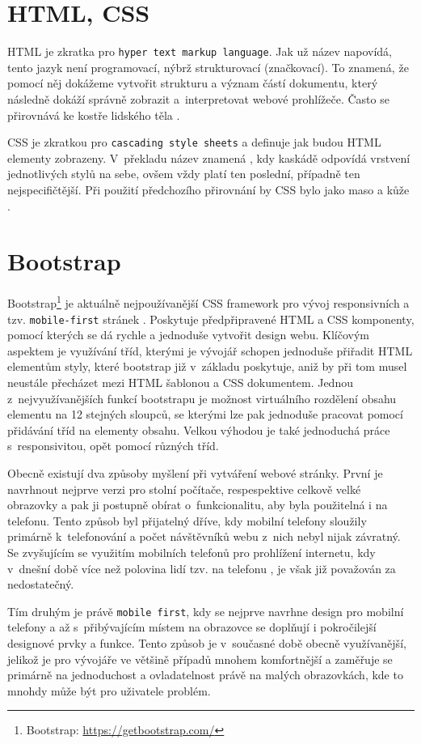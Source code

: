 \section{HTML, CSS}
HTML je zkratka pro \texttt{hyper text markup language}. Jak už název napovídá, tento jazyk není programovací, nýbrž strukturovací (značkovací). To znamená, že pomocí něj dokážeme vytvořit strukturu a význam částí dokumentu, který následně dokáží správně zobrazit a~interpretovat webové prohlížeče. Často se přirovnává ke kostře lidského těla \cite{HTML}.  

\par CSS je zkratkou pro \texttt{cascading style sheets} a definuje jak budou HTML elementy zobrazeny. V~překladu název znamená , kdy kaskádě odpovídá vrstvení jednotlivých stylů na sebe, ovšem vždy platí ten poslední, případně ten nejspecifičtější. Při použití předchozího přirovnání by CSS bylo jako maso a kůže \cite{CSS}. 


\section{Bootstrap}
Bootstrap\footnote{Bootstrap: \url{https://getbootstrap.com/}} je aktuálně nejpoužívanější CSS framework pro vývoj responsivních a tzv. \texttt{mobile-first} stránek \cite{BOOTSTRAP}. Poskytuje předpřipravené HTML a CSS komponenty, pomocí kterých se dá rychle a jednoduše vytvořit design webu. Klíčovým aspektem je využívání tříd, kterými je vývojář schopen jednoduše přiřadit HTML elementům styly, které bootstrap již v~základu poskytuje, aniž by při tom musel neustále přecházet mezi HTML šablonou a CSS dokumentem. Jednou z~nejvyužívanějších funkcí bootstrapu je možnost virtuálního rozdělení obsahu elementu na 12 stejných sloupců, se kterými lze pak jednoduše pracovat pomocí přidávání tříd na elementy obsahu. Velkou výhodou je také jednoduchá práce s~responsivitou, opět pomocí různých tříd.
\par  Obecně existují dva způsoby myšlení při vytváření webové stránky. První je navrhnout nejprve verzi pro stolní počítače, respespektive celkově velké obrazovky a pak ji postupně obírat o~funkcionalitu, aby byla použitelná i na telefonu. Tento způsob byl přijatelný dříve, kdy mobilní telefony sloužily primárně k~telefonování a počet návštěvníků webu z~nich nebyl nijak závratný. Se zvyšujícím se využitím mobilních telefonů pro prohlížení internetu, kdy v~dnešní době více než polovina lidí tzv.  na telefonu \cite{WEB-DEVICE-USAGE}, je však již považován za nedostatečný.
\par Tím druhým je právě \texttt{mobile first}, kdy se nejprve navrhne design pro mobilní telefony a až s~přibývajícím místem na obrazovce se doplňují i pokročilejší designové prvky a funkce. Tento způsob je v~současné době obecně využívanější, jelikož je pro vývojáře ve většině případů mnohem komfortnější a zaměřuje se primárně na jednoduchost a ovladatelnost právě na malých obrazovkách, kde to mnohdy může být pro uživatele problém.

